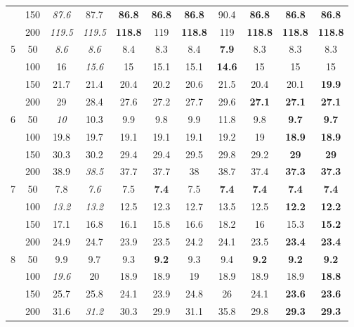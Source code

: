 \begin{table}[htbp]
{\begin{adjustbox}{angle=90}
\begin{tabular}{|c|c|c|c|c|c|c|c|c|c|c|}
     & 150 & \textit{87.6} & 87.7 & \textbf{86.8} & \textbf{86.8} & \textbf{86.8} & 90.4 & \textbf{86.8} & \textbf{86.8} & \textbf{86.8} \\ 
     & 200 & \textit{119.5} & \textit{119.5} & \textbf{118.8} & 119 & \textbf{118.8} & 119 & \textbf{118.8} & \textbf{118.8} & \textbf{118.8} \\ \hline
    5 & 50 & \textit{8.6} & \textit{8.6} & 8.4 & 8.3 & 8.4 & \textbf{7.9} & 8.3 & 8.3 & 8.3 \\ 
     & 100 & 16 & \textit{15.6} & 15 & 15.1 & 15.1 & \textbf{14.6} & 15 & 15 & 15 \\ 
     & 150 & 21.7 & 21.4 & 20.4 & 20.2 & 20.6 & 21.5 & 20.4 & 20.1 & \textbf{19.9} \\ 
     & 200 & 29 & 28.4 & 27.6 & 27.2 & 27.7 & 29.6 & \textbf{27.1} & \textbf{27.1} & \textbf{27.1} \\ \hline
    6 & 50 & \textit{10} & 10.3 & 9.9 & 9.8 & 9.9 & 11.8 & 9.8 & \textbf{9.7} & \textbf{9.7} \\ 
     & 100 & 19.8 & 19.7 & 19.1 & 19.1 & 19.1 & 19.2 & 19 & \textbf{18.9} & \textbf{18.9} \\ 
     & 150 & 30.3 & 30.2 & 29.4 & 29.4 & 29.5 & 29.8 & 29.2 & \textbf{29} & \textbf{29} \\ 
     & 200 & 38.9 & \textit{38.5} & 37.7 & 37.7 & 38 & 38.7 & 37.4 & \textbf{37.3} & \textbf{37.3} \\ \hline
    7 & 50 & 7.8 & \textit{7.6} & 7.5 & \textbf{7.4} & 7.5 & \textbf{7.4} & \textbf{7.4} & \textbf{7.4} & \textbf{7.4} \\ 
     & 100 & \textit{13.2} & \textit{13.2} & 12.5 & 12.3 & 12.7 & 13.5 & 12.5 & \textbf{12.2} & \textbf{12.2} \\ 
     & 150 & 17.1 & 16.8 & 16.1 & 15.8 & 16.6 & 18.2 & 16 & 15.3 & \textbf{15.2} \\ 
     & 200 & 24.9 & 24.7 & 23.9 & 23.5 & 24.2 & 24.1 & 23.5 & \textbf{23.4} & \textbf{23.4} \\ \hline
    8 & 50 & 9.9 & 9.7 & 9.3 & \textbf{9.2} & 9.3 & 9.4 & \textbf{9.2} & \textbf{9.2} & \textbf{9.2} \\ 
     & 100 & \textit{19.6} & 20 & 18.9 & 18.9 & 19 & 18.9 & 18.9 & 18.9 & \textbf{18.8} \\ 
     & 150 & 25.7 & 25.8 & 24.1 & 23.9 & 24.8 & 26 & 24.1 & \textbf{23.6} & \textbf{23.6} \\ 
     & 200 & 31.6 & \textit{31.2} & 30.3 & 29.9 & 31.1 & 35.8 & 29.8 & \textbf{29.3} & \textbf{29.3} \\ \hline
    \end{tabular}
    \end{adjustbox}}
    \label{exp:literature_bins}
    \end{table}
    